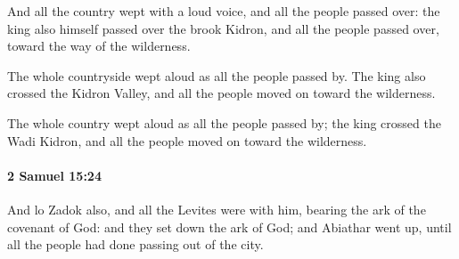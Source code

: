 			\begin{versebox}
					\item[BHS] 
					\item[ASV] And all the country wept with a loud voice, and all the people passed over: the king also himself passed over the brook Kidron, and all the people passed over, toward the way of the wilderness.
					\item[NIV] The whole countryside wept aloud as all the people passed by. The king also crossed the Kidron Valley, and all the people moved on toward the wilderness.
					\item[NRSV] The whole country wept aloud as all the people passed by; the king crossed the Wadi Kidron, and all the people moved on toward the wilderness.
			\end{versebox}

		\paragraph{2 Samuel 15:24} %
			\label{2SAMUEL-15-24}

			And lo Zadok also, and all the Levites were with him, bearing the ark of the covenant of God: and they set down the ark of God; and Abiathar went up, until all the people had done passing out of the city.

